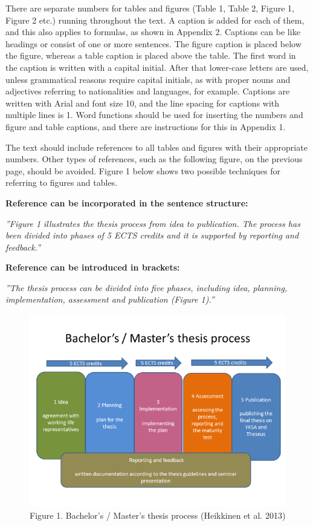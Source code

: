 \documentclass[12pt]{article}
\begin{document}
There are separate numbers for tables and figures (Table 1, Table 2, Figure 1, Figure 2 etc.) running throughout the text. A caption is added for each of them, and this also applies to formulas, as shown in Appendix 2. Captions can be like headings or consist of one or more sentences. The figure caption is placed below the figure, whereas a table caption is placed above the table. The first word in the caption is written with a capital initial. After that lower-case letters are used, unless grammatical reasons require capital initials, as with proper nouns and adjectives referring to nationalities and languages, for example. Captions are written with Arial and font size 10, and the line spacing for captions with multiple lines is 1. Word functions should be used for inserting the numbers and figure and table captions, and there are instructions for this in Appendix 1.

The text should include references to all tables and figures with their appropriate numbers. Other types of references, such as the following figure, on the previous page, should be avoided. Figure 1 below shows two possible techniques for referring to figures and tables.

\textbf{Reference can be incorporated in the sentence structure:}

\textit{”Figure 1 illustrates the thesis process from idea to publication. The process has been divided into phases of 5 ECTS credits and it is supported by reporting and feedback.”}

\textbf{Reference can be introduced in brackets:}

\textit{”The thesis process can be divided into five phases, including idea, planning, implementation, assessment and publication (Figure 1).”}

\begin{figure}
	\includegraphics{Figure1.png}
	\caption{Figure 1. Bachelor’s / Master’s thesis process (Heikkinen et al. 2013)}
\end{figure}
\end{document}
